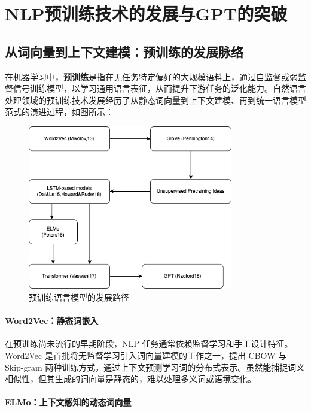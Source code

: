 \documentclass[a4paper,12pt]{article}
\begin{document}
    \section{NLP预训练技术的发展与GPT的突破}

    \subsection{从词向量到上下文建模：预训练的发展脉络}
    
    在机器学习中，\textbf{预训练}是指在无任务特定偏好的大规模语料上，通过自监督或弱监督信号训练模型，以学习通用语言表征，从而提升下游任务的泛化能力。自然语言处理领域的预训练技术发展经历了从静态词向量到上下文建模、再到统一语言模型范式的演进过程，如图所示：
    
    \begin{figure}[H]
        \centering
        \includegraphics[width=0.8\textwidth]{image/发展脉络.png}
        \caption{预训练语言模型的发展路径}
    \end{figure}
    
    \paragraph{Word2Vec：静态词嵌入}
    
    在预训练尚未流行的早期阶段，NLP 任务通常依赖监督学习和手工设计特征。Word2Vec 是首批将无监督学习引入词向量建模的工作之一，提出 CBOW 与 Skip-gram 两种训练方式，通过上下文预测学习词的分布式表示。虽然能捕捉词义相似性，但其生成的词向量是静态的，难以处理多义词或语境变化。
    
    \paragraph{ELMo：上下文感知的动态词向量}
    
\end{document}
